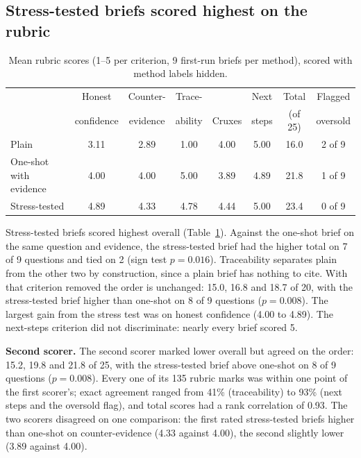 \documentclass[11pt]{article}
\begin{document}
\subsection{Stress-tested briefs scored highest on the rubric}

\begin{table}[h]
\centering
\small
\begin{tabular}{lccccccc}
\toprule
 & Honest & Counter- & Trace- & & Next & Total & Flagged \\
 & confidence & evidence & ability & Cruxes & steps & (of 25) & oversold \\
\midrule
Plain & 3.11 & 2.89 & 1.00 & 4.00 & 5.00 & 16.0 & 2 of 9 \\
One-shot with evidence & 4.00 & 4.00 & 5.00 & 3.89 & 4.89 & 21.8 & 1 of 9 \\
Stress-tested & 4.89 & 4.33 & 4.78 & 4.44 & 5.00 & 23.4 & 0 of 9 \\
\bottomrule
\end{tabular}
\caption{Mean rubric scores (1--5 per criterion, 9 first-run briefs per method), scored with method labels hidden.}
\label{tab:rubric}
\end{table}

Stress-tested briefs scored highest overall (Table~\ref{tab:rubric}). Against the one-shot brief on the same question and evidence, the stress-tested brief had the higher total on 7 of 9 questions and tied on 2 (sign test $p = 0.016$). Traceability separates plain from the other two by construction, since a plain brief has nothing to cite. With that criterion removed the order is unchanged: 15.0, 16.8 and 18.7 of 20, with the stress-tested brief higher than one-shot on 8 of 9 questions ($p = 0.008$). The largest gain from the stress test was on honest confidence (4.00 to 4.89). The next-steps criterion did not discriminate: nearly every brief scored 5.

\textbf{Second scorer.} The second scorer marked lower overall but agreed on the order: 15.2, 19.8 and 21.8 of 25, with the stress-tested brief above one-shot on 8 of 9 questions ($p = 0.008$). Every one of its 135 rubric marks was within one point of the first scorer's; exact agreement ranged from 41\% (traceability) to 93\% (next steps and the oversold flag), and total scores had a rank correlation of 0.93. The two scorers disagreed on one comparison: the first rated stress-tested briefs higher than one-shot on counter-evidence (4.33 against 4.00), the second slightly lower (3.89 against 4.00).
\end{document}
